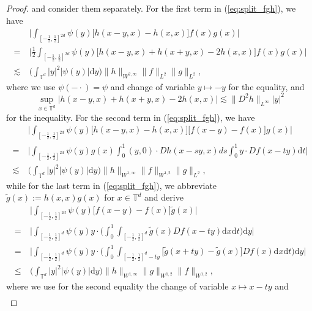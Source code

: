 \begin{proof}
and consider them separately. For the first term in (\ref{eq:split_fgh}), we have 
\begin{align*}
& \ \Big| \int_{[-\frac{1}{2}, \frac{1}{2}]^{2d}}  \psi(y)  \big[h(x - y, x) - h(x,x)\big]f(x)g(x)\Big|\\
= & \ \Big|\frac{1}{2}\int_{[-\frac{1}{2}, \frac{1}{2}]^{2d}}  \psi(y)  \big[h(x - y, x) + h(x + y, x)  - 2h(x,x)\big]f(x)g(x)\Big|\\
\lesssim & \ \Big(\int_{\mathbb{T}^d} |y|^2 |\psi(y)|\mathrm{d}y\Big) \|h\|_{W^{2,\infty}}\|f\|_{L^2}\|g\|_{L^2},
\end{align*}
where we use $\psi(-\cdot) = \psi$ and change of variable $y \mapsto -y$ for the equality, and 
\[
\sup_{x \in \mathbb{T}^d}\big|h(x - y, x) + h(x + y, x)  - 2h(x,x)\big| \lesssim \|D^2 h\|_{L^{\infty}}|y|^2
\]
for the inequality. For the second term in (\ref{eq:split_fgh}), we have 
\begin{align*}
& \ \Big| \int_{[-\frac{1}{2}, \frac{1}{2}]^{2d}} \psi(y) \big[h(x - y, x) - h(x,x)\big]\big[f(x - y) - f(x)\big]g(x)\Big|\\
= & \ \Big|\int_{[-\frac{1}{2}, \frac{1}{2}]^{2d}}  \psi(y) g(x) \int_0^1 (y,0) \cdot D h(x - sy,x) ds \int_0^1 y \cdot Df(x - ty) \mathrm{d}t\Big|\\
\lesssim & \ \Big(\int_{\mathbb{T}^d} |y|^2 |\psi(y)|\mathrm{d}y\Big) \|h\|_{W^{1,\infty}}\|f\|_{W^{1,2}}\|g\|_{L^2},
\end{align*}
while for the last term in (\ref{eq:split_fgh}), we abbreviate $\tilde{g}(x) := h(x,x)g(x)$ for $x \in \mathbb{T}^d$ and derive
\begin{align*}
& \ \Big| \int_{[-\frac{1}{2}, \frac{1}{2}]^{2d}} \psi(y) \big[f(x - y) - f(x)\big]\tilde{g}(x)\Big|\\
= & \ \Big|\int_{[-\frac{1}{2}, \frac{1}{2}]^{d}}  \psi(y) y \cdot \big(  \int_0^1 \int_{[-\frac{1}{2}, \frac{1}{2}]^d} \tilde{g}(x)   Df(x - ty) \mathrm{d}x \mathrm{d}t \big)\mathrm{d}y\Big|\\
= & \ \Big|\int_{[-\frac{1}{2}, \frac{1}{2}]^d}  \psi(y) y \cdot \Big(  \int_0^1 \int_{[-\frac{1}{2}, \frac{1}{2}]^d - ty} \big[\tilde{g}(x + ty) - \tilde{g}(x)\big] Df(x) \mathrm{d}x \mathrm{d}t \Big)\mathrm{d}y\Big|\\
\leq & \ \Big( \int_{\mathbb{T}^d}|y|^2|\psi(y)|\mathrm{d}y\Big) \|h\|_{W^{1,\infty}}\|g\|_{W^{1,2}}\|f\|_{W^{1,2}},
\end{align*}
where we use for the second equality the change of variable $x \mapsto x - ty$ and
\begin{align*}

\end{align*}
\end{proof}
